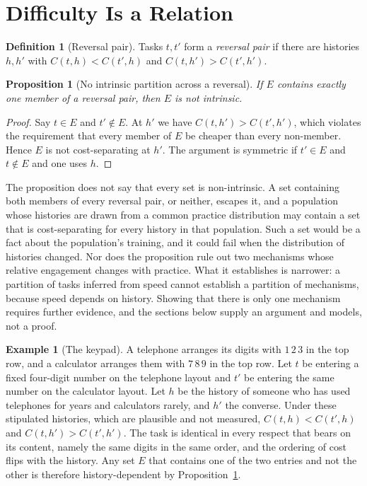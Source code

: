 \documentclass[11pt]{article}
\newtheorem{proposition}{Proposition}
\theoremstyle{definition}
\newtheorem{definition}{Definition}
\newtheorem{example}{Example}
\begin{document}
\section{Difficulty Is a Relation}

\begin{definition}[Reversal pair]
Tasks $t,t'$ form a \emph{reversal pair} if there are histories $h,h'$ with $C(t,h)<C(t',h)$ and $C(t,h')>C(t',h')$.
\end{definition}

\begin{proposition}[No intrinsic partition across a reversal]\label{prop:reversal}
If $E$ contains exactly one member of a reversal pair, then $E$ is not intrinsic.
\end{proposition}

\begin{proof}
Say $t\in E$ and $t'\notin E$. At $h'$ we have $C(t,h')>C(t',h')$, which violates the requirement that every member of $E$ be cheaper than every non-member. Hence $E$ is not cost-separating at $h'$. The argument is symmetric if $t'\in E$ and $t\notin E$ and one uses $h$.
\end{proof}

The proposition does not say that every set is non-intrinsic. A set containing both members of every reversal pair, or neither, escapes it, and a population whose histories are drawn from a common practice distribution may contain a set that is cost-separating for every history in that population. Such a set would be a fact about the population's training, and it could fail when the distribution of histories changed. Nor does the proposition rule out two mechanisms whose relative engagement changes with practice. What it establishes is narrower: a partition of tasks inferred from speed cannot establish a partition of mechanisms, because speed depends on history. Showing that there is only one mechanism requires further evidence, and the sections below supply an argument and models, not a proof.

\begin{example}[The keypad]
A telephone arranges its digits with $1\,2\,3$ in the top row, and a calculator arranges them with $7\,8\,9$ in the top row. Let $t$ be entering a fixed four-digit number on the telephone layout and $t'$ be entering the same number on the calculator layout. Let $h$ be the history of someone who has used telephones for years and calculators rarely, and $h'$ the converse. Under these stipulated histories, which are plausible and not measured, $C(t,h)<C(t',h)$ and $C(t,h')>C(t',h')$. The task is identical in every respect that bears on its content, namely the same digits in the same order, and the ordering of cost flips with the history. Any set $E$ that contains one of the two entries and not the other is therefore history-dependent by Proposition~\ref{prop:reversal}.
\end{example}
\end{document}
